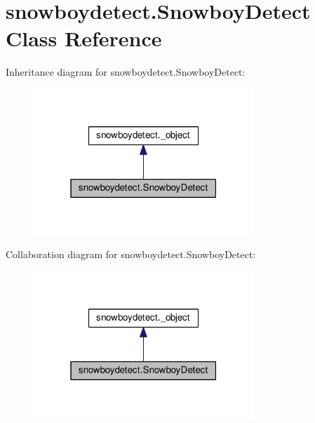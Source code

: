 \hypertarget{classsnowboydetect_1_1SnowboyDetect}{}\section{snowboydetect.\+Snowboy\+Detect Class Reference}
\label{classsnowboydetect_1_1SnowboyDetect}


Inheritance diagram for snowboydetect.\+Snowboy\+Detect\+:\nopagebreak
\begin{figure}[H]
\begin{center}
\leavevmode
\includegraphics[width=235pt]{classsnowboydetect_1_1SnowboyDetect__inherit__graph}
\end{center}
\end{figure}


Collaboration diagram for snowboydetect.\+Snowboy\+Detect\+:\nopagebreak
\begin{figure}[H]
\begin{center}
\leavevmode
\includegraphics[width=235pt]{classsnowboydetect_1_1SnowboyDetect__coll__graph}
\end{center}
\end{figure}
